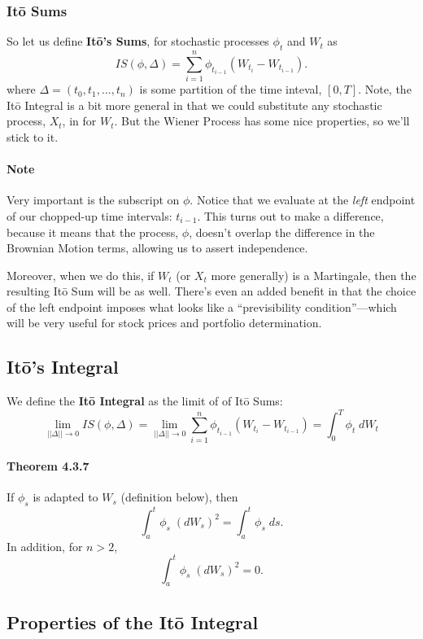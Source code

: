 \documentclass[12pt]{article}
\theoremstyle{plain}
\theoremstyle{definition}
\theoremstyle{remark}
\begin{document}
\subsubsection{It\={o} Sums}

So let us define \textbf{It\={o}'s Sums}, for stochastic processes
$\phi_t$ and $W_t$ as
   \[ IS(\phi,\Delta)=\sum^n_{i=1} \phi_{t_{i-1}}(W_{t_i}-W_{t_{i-1}}).\]
where $\Delta = (t_0, t_1,\ldots,t_n)$ is some partition of the time
inteval, $[0,T]$. Note, the It\={o} Integral
is a bit more general in that we
could substitute any stochastic process, $X_t$, in for $W_t$.  But
the Wiener Process has some nice properties, so we'll stick to it.

\paragraph{Note} Very important is the subscript on $\phi$.  Notice that
we evaluate at the \emph{left} endpoint of our chopped-up time
intervals: $t_{i-1}$.  This turns out to make a difference, because it
means that the process, $\phi$, doesn't overlap the difference in the
Brownian Motion terms, allowing us to assert independence.

Moreover, when we do this, if $W_t$ (or $X_t$ more generally) is a
Martingale, then the resulting It\={o} Sum will be as well. There's
even an added benefit in that the choice of the left endpoint
imposes what looks like a ``previsibility condition''---which will
be very useful for stock prices and portfolio determination.

\subsection{It\={o}'s Integral}

We define the \textbf{It\={o} Integral} as the limit of of It\={o}
Sums:
   \[ \lim_{||\Delta|| \rightarrow 0}IS(\phi,\Delta) =
      \lim_{||\Delta|| \rightarrow 0} \sum^n_{i=1} \phi_{t_{i-1}}(W_{t_i}
      -W_{t_{i-1}})= \int_0^T \phi_t \;dW_t \]

\paragraph{Theorem 4.3.7} If $\phi_s$ is adapted to $W_s$ (definition
below), then
   \[ \int_a^t \phi_s \; (dW_s)^2 = \int_a^t \phi_s \; ds.\]
In addition, for $n>2$,
   \[ \int_a^t \phi_s \; (dW_s)^2 = 0. \]


\subsection{Properties of the It\={o} Integral}
\end{document}
